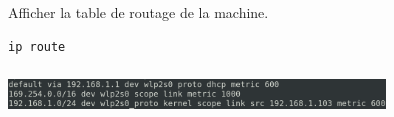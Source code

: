 \documentclass[svgnames,11pt]{beamer}
\begin{document}
\begin{frame}[fragile]
    \begin{activite}
        Afficher la table de routage de la machine.
        \begin{lstlisting}[language=bash]
ip route
\end{lstlisting}
    \end{activite}
\end{frame}
\begin{frame}
    \frametitle{}

    \begin{center}
        \centering
        \includegraphics[width=10cm]{ressources/route.png}
        \label{IMG}
    \end{center}

\end{frame}
\end{document}
